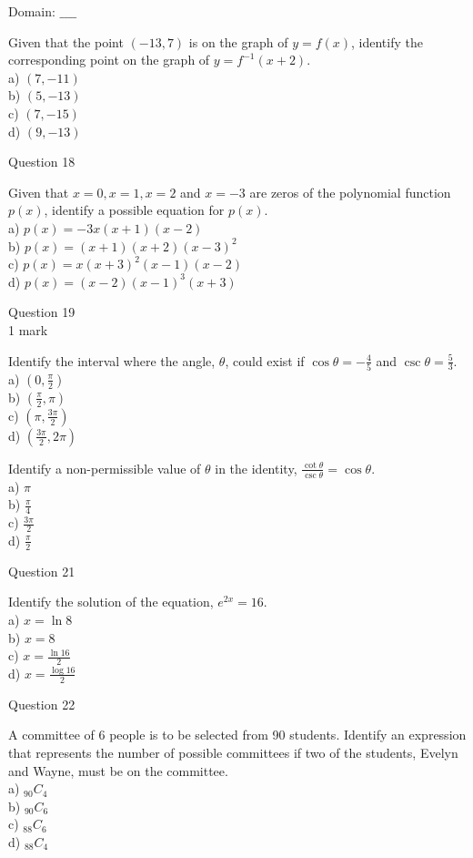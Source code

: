 \documentclass[10pt]{article}
\begin{document}
Domain: $\_\_\_\_$

Given that the point $(-13,7)$ is on the graph of $y=f(x)$, identify the corresponding point on the graph of $y=f^{-1}(x+2)$.\\
a) $(7,-11)$\\
b) $(5,-13)$\\
c) $(7,-15)$\\
d) $(9,-13)$

Question 18

Given that $x=0, x=1, x=2$ and $x=-3$ are zeros of the polynomial function $p(x)$, identify a possible equation for $p(x)$.\\
a) $p(x)=-3 x(x+1)(x-2)$\\
b) $p(x)=(x+1)(x+2)(x-3)^{2}$\\
c) $p(x)=x(x+3)^{2}(x-1)(x-2)$\\
d) $p(x)=(x-2)(x-1)^{3}(x+3)$

Question 19\\
1 mark

Identify the interval where the angle, $\theta$, could exist if $\cos \theta=-\frac{4}{5}$ and $\csc \theta=\frac{5}{3}$.\\
a) $\left(0, \frac{\pi}{2}\right)$\\
b) $\left(\frac{\pi}{2}, \pi\right)$\\
c) $\left(\pi, \frac{3 \pi}{2}\right)$\\
d) $\left(\frac{3 \pi}{2}, 2 \pi\right)$

Identify a non-permissible value of $\theta$ in the identity, $\frac{\cot \theta}{\csc \theta}=\cos \theta$.\\
a) $\pi$\\
b) $\frac{\pi}{4}$\\
c) $\frac{3 \pi}{2}$\\
d) $\frac{\pi}{2}$

Question 21

Identify the solution of the equation, $e^{2 x}=16$.\\
a) $x=\ln 8$\\
b) $x=8$\\
c) $x=\frac{\ln 16}{2}$\\
d) $x=\frac{\log 16}{2}$

Question 22

A committee of 6 people is to be selected from 90 students. Identify an expression that represents the number of possible committees if two of the students, Evelyn and Wayne, must be on the committee.\\
a) ${ }_{90} C_{4}$\\
b) ${ }_{90} C_{6}$\\
c) ${ }_{88} C_{6}$\\
d) ${ }_{88} C_{4}$
\end{document}
